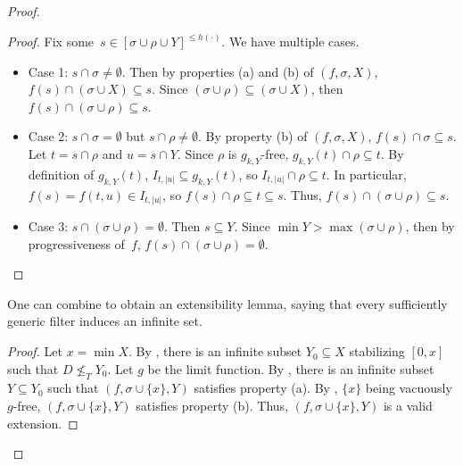 \documentclass{article}
\newcommand{\uh}{\upharpoonright}
\newcommand{\NN}[0]{\mathbb{N}}
\numberwithin{theorem}{section}
\newtheorem{lemma}[theorem]{Lemma}
\begin{document}
\begin{proof}
\begin{proof}
Fix some~$s \in [\sigma \cup \rho \cup Y]^{\leq h(\cdot)}$. We have multiple cases.
\begin{itemize}
    \item Case 1: $s \cap \sigma \neq \emptyset$. Then by properties (a) and (b) of $(f, \sigma, X)$, $f(s) \cap (\sigma \cup X) \subseteq s$. Since $(\sigma \cup \rho) \subseteq (\sigma \cup X)$, then $f(s) \cap (\sigma \cup \rho) \subseteq s$.
    \item Case 2: $s \cap \sigma = \emptyset$ but $s \cap \rho \neq \emptyset$. By property (b) of $(f, \sigma, X)$, $f(s) \cap \sigma \subseteq s$. Let $t = s \cap \rho$ and $u = s \cap Y$. Since $\rho$ is $g_{k,Y}$-free, $g_{k,Y}(t) \cap \rho \subseteq t$. By definition of $g_{k,Y}(t)$, $I_{t, |u|} \subseteq g_{k,Y}(t)$, so $I_{t, |u|} \cap \rho \subseteq t$. In particular, $f(s) = f(t, u) \in I_{t, |u|}$, so $f(s) \cap \rho \subseteq t \subseteq s$. Thus, $f(s) \cap (\sigma \cup \rho) \subseteq s$.
    \item Case 3: $s \cap (\sigma \cup \rho) = \emptyset$. Then $s \subseteq Y$. Since $\min Y > \max (\sigma \cup \rho)$, then by progressiveness of~$f$, $f(s) \cap (\sigma \cup \rho) = \emptyset$.
\end{itemize}
\end{proof}

One can combine  to obtain an extensibility lemma, saying that every sufficiently generic filter induces an infinite set. 

\begin{proof}
Let $x = \min X$. By , there is an infinite subset $Y_0 \subseteq X$ stabilizing $[0, x]$ such that $D \not \leq_T Y_0$. Let $g$ be the limit function. By , there is an infinite subset $Y \subseteq Y_0$ such that $(f, \sigma \cup \{x\}, Y)$ satisfies property (a).
By , $\{x\}$ being vacuously $g$-free, $(f, \sigma \cup \{x\}, Y)$ satisfies property (b). Thus, $(f, \sigma \cup \{x\}, Y)$ is a valid extension.
\end{proof}


\end{proof}
\end{document}
